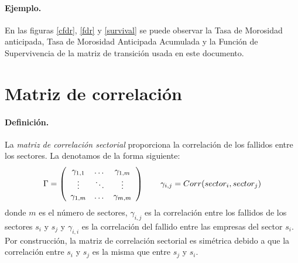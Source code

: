 \paragraph{Ejemplo.} En las figuras \ref{cfdr}, \ref{fdr} y \ref{survival}
se puede observar la Tasa de Morosidad anticipada, Tasa de Morosidad Anticipada 
Acumulada y la Funci\'on de Supervivencia de la matriz de transici\'on usada en 
este documento.


\section{Matriz de correlaci\'on}
\label{sec:mcorrel}

\paragraph{Definici\'on.} La \emph{matriz de correlaci\'on sectorial}
 proporciona la correlaci\'on de los
fallidos entre los sectores. La denotamos de la forma siguiente:
\begin{displaymath}
\Gamma = \left(
\begin{array}{ccc}
\gamma_{1,1} & \dots  & \gamma_{1,m} \cr
\vdots & \ddots & \vdots \cr
\gamma_{1,m} & \dots  & \gamma_{m,m} 
\end{array}
\right)
\qquad
\gamma_{i,j} = Corr(sector_i, sector_j)
\end{displaymath}
donde $m$ es el n\'umero de sectores, $\gamma_{i,j}$ es la correlaci\'on entre 
los fallidos de los sectores $s_i$ y $s_j$ y $\gamma_{i,i}$ es la correlaci\'on del 
fallido entre las empresas del sector $s_i$. Por construcci\'on, la matriz de 
correlaci\'on sectorial es sim\'etrica debido a que la correlaci\'on entre $s_i$
y $s_j$ es la misma que entre $s_j$ y $s_i$.

